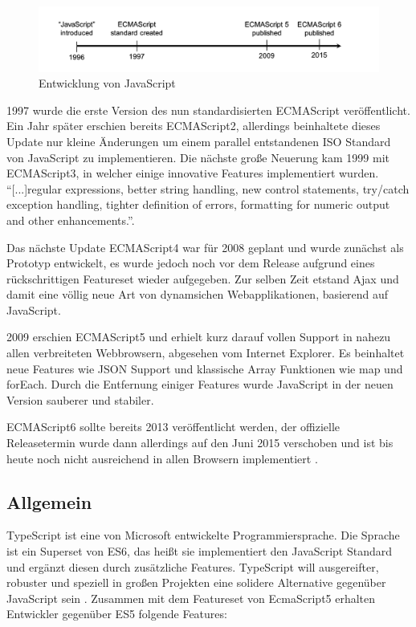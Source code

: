 \begin{figure}[hp]
 \centering
 \includegraphics[width=\linewidth]{kapitel2/javascript-timeline.png}
 \caption{Entwicklung von JavaScript \cite[28]{EssentialTS}}
\end{figure}

1997 wurde die erste Version des nun standardisierten ECMAScript veröffentlicht. Ein Jahr später erschien bereits ECMAScript2,
allerdings beinhaltete dieses Update nur kleine Änderungen um einem parallel entstandenen ISO Standard von JavaScript zu implementieren.
Die nächste große Neuerung kam 1999 mit ECMAScript3, in welcher einige innovative Features implementiert wurden.
``[...]regular expressions, better string handling, new control statements, try/catch exception handling, tighter definition of errors, formatting for numeric output and other enhancements.''\cite{js-vs-es}.

Das nächste Update ECMAScript4 war für 2008 geplant und wurde zunächst als Prototyp entwickelt,
es wurde jedoch noch vor dem Release aufgrund eines rückschrittigen Featureset wieder aufgegeben.
Zur selben Zeit etstand Ajax und damit eine völlig neue Art von dynamsichen Webapplikationen,
basierend auf JavaScript.

2009 erschien ECMAScript5 und erhielt kurz darauf vollen Support in nahezu allen verbreiteten Webbrowsern, abgesehen vom Internet Explorer.
Es beinhaltet neue Features wie \ac{JSON} Support und klassische Array Funktionen wie map und forEach.
Durch die Entfernung einiger Features wurde JavaScript in der neuen Version sauberer und stabiler.

ECMAScript6 sollte bereits 2013 veröffentlicht werden, der offizielle Releasetermin wurde
dann allerdings auf den Juni 2015 verschoben und ist bis heute noch nicht ausreichend in allen Browsern implementiert
\cite{js-vs-es}.

\subsection{Allgemein}

TypeScript ist eine von Microsoft entwickelte Programmiersprache.
Die Sprache ist ein Superset von ES6, das heißt sie implementiert den JavaScript Standard und ergänzt diesen
durch zusätzliche Features.
TypeScript will ausgereifter, robuster und speziell in großen Projekten eine solidere Alternative gegenüber JavaScript sein \cite[28]{EssentialTS}.
Zusammen mit dem Featureset von EcmaScript5 erhalten Entwickler gegenüber ES5 folgende Features:

